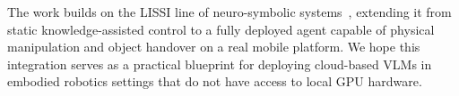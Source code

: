 \documentclass[twocolumn,10pt]{article}
\begin{document}
The work builds on the LISSI line of neuro-symbolic
systems~\cite{abdelkawy2021ral,eladdachi2025llm}, extending it from
static knowledge-assisted control to a fully deployed agent capable of
physical manipulation and object handover on a real mobile platform.
We hope this integration serves as a practical blueprint for deploying
cloud-based VLMs in embodied robotics settings that do not have access
to local GPU hardware.



\end{document}

